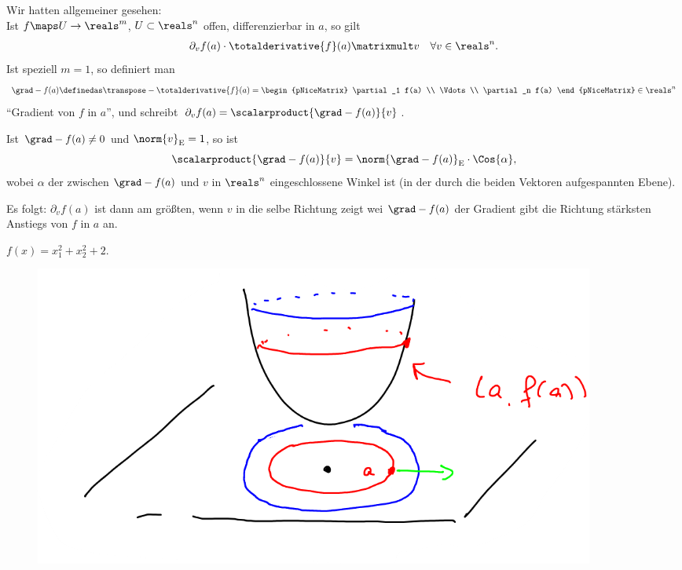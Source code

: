\begin{bemdef}
    Wir hatten allgemeiner gesehen:\\
    Ist \( f\maps U\to \reals^m \), \( U\subset \reals^n \) offen, differenzierbar in \( a \), so gilt
    \begin{align*}
        \partial_v f(a)\cdot \totalderivative{f}(a)\matrixmult v\quad \forall v\in \reals^n.
    \end{align*}
    Ist speziell \( m=1 \), so definiert man
    \begin{align*}
        \grad-{f(a)}\definedas \transpose-{\totalderivative{f}(a)}=\begin{pNiceMatrix} \partial_1 f(a) \\ \Vdots \\ \partial_n f(a) \end{pNiceMatrix}\in \reals^n
    \end{align*}
    \enquote{Gradient von \( f \) in \( a \)}, und schreibt \( \partial_v f(a)=\scalarproduct{\grad-{f(a)}}{v} \).

    Ist \( \grad-{f(a)}\neq 0 \) und \( \norm{v}_{\text{E}}=1 \), so ist
    \begin{equation*}
        \scalarproduct{\grad-{f(a)}}{v}=\norm{\grad-{f(a)}}_{\text{E}}\cdot\Cos{\alpha},
    \end{equation*}
    wobei \( \alpha \) der zwischen \( \grad-{f(a)} \) und \( v \) in \( \reals^n \) eingeschlossene Winkel ist (in der durch die beiden Vektoren aufgespannten Ebene).

    Es folgt: \( \partial_v f(a) \) ist dann am größten, wenn \( v \) in die selbe Richtung zeigt wei \( \grad-{f(a)} \) \timplies der Gradient gibt die Richtung stärksten Anstiegs von \( f \) in \( a \) an.
\end{bemdef}
\begin{beispiel*}
    \( f(x)=x_1^2+x_2^2+2 \).
    \begin{figure}[H]
        \centering
        \includegraphics[width=0.5\linewidth]{figures/gradient_beispiel_parabel}
        \label{fig:gradient_beispiel_parabel}
    \end{figure}
\end{beispiel*}
